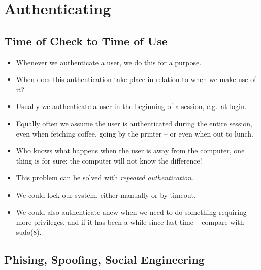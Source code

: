 \documentclass{beamer}
\begin{document}
\section{Authenticating}

\subsection{Time of Check to Time of Use}

\begin{frame}
  \begin{itemize}
    \item Whenever we authenticate a user, we do this for a purpose.

    \item When does this authentication take place in relation to when we make 
      use of it?

    \item Usually we authenticate a user in the beginning of a session, e.g.\ 
      at login.

    \item Equally often we assume the user is authenticated during the entire 
      session, even when fetching coffee, going by the printer -- or even when 
      out to lunch.

    \item Who knows what happens when the user is away from the computer, one 
      thing is for sure: the computer will not know the difference!

  \end{itemize}
\end{frame}

\begin{frame}
  \begin{itemize}
    \item This problem can be solved with \emph{repeated authentication}.

    \item We could lock our system, either manually or by timeout.

    \item We could also authenticate anew when we need to do something 
      requiring more privileges, and if it has been a while since last time -- 
      compare with sudo(8).
  \end{itemize}
\end{frame}

\subsection{Phising, Spoofing, Social Engineering}
\end{document}
